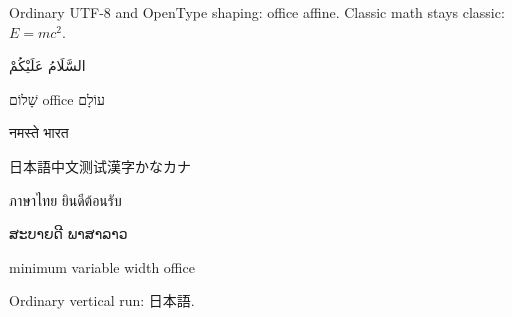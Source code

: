 \documentclass{article}
\begin{document}
Ordinary UTF-8 and OpenType shaping: office affine. Classic math stays classic:
$E=mc^2$.

{\arabicfont{}السَّلَامُ عَلَيْكُمْ}

{\hebrewfont{}שָׁלוֹם office עוֹלָם}

{\devanagarifont{}नमस्ते भारत}

{\cjkfont{}日本語中文测试漢字かなカナ}

{\thaifont{}ภาษาไทย ยินดีต้อนรับ}

{\laofont{}ສະບາຍດີ ພາສາລາວ}

{%
minimum variable width office}

Ordinary vertical run: {\cjkfont{}日本語}.
\end{document}
